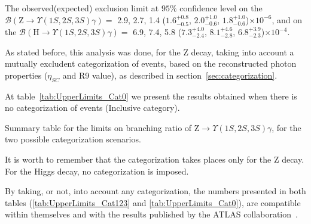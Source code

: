 The observed(expected) exclusion limit at $95\%$ confidence level on the $\mathcal{B}(\mathrm{Z}\to\Upsilon(1S,2S,3S)\gamma)=$ 2.9, 2.7, 1.4 ($1.6^{+0.8}_{-0.5}$,  $2.0^{+1.0}_{-0.6}$, $1.8^{+1.0}_{-0.6}$)$\times 10^{-6}$, and on the $\mathcal{B}(\mathrm{H}\to\Upsilon(1S,2S,3S)\gamma)=$ 6.9, 7.4, 5.8 ($7.3^{+4.0}_{-2.4}$,  $8.1^{+4.6}_{-2.8}$, $6.8^{+3.9}_{-2.3}$)$\times 10^{-4}$.

As stated before, this analysis was done, for the Z decay, taking into account a mutually excludent categorization of events, based on the reconstructed photon properties ($\eta_{SC}$ and R9 value), as described in section~\ref{sec:categorization}. 

At table~\ref{tab:UpperLimits_Cat0} we present the results obtained when there is no categorization of events (Inclusive category).

\begin{table}[ht]
\begin{center}
\caption{Summary table for the limits on branching ratio of $\mathrm{Z}\to\Upsilon(1S,2S,3S)\gamma$, for the two possible categorization scenarios.}
% 

\label{tab:UpperLimits_Cat0}
\end{center}
\end{table}


It is worth to remember that the categorization takes places only for the Z decay. For the Higgs decay, no categorization is imposed.

By taking, or not, into account any categorization, the numbers presented in both tables (\ref{tab:UpperLimits_Cat123} and \ref{tab:UpperLimits_Cat0}), are compatible within themselves and with the results published by the ATLAS collaboration~\cite{Aaboud_2018}.

